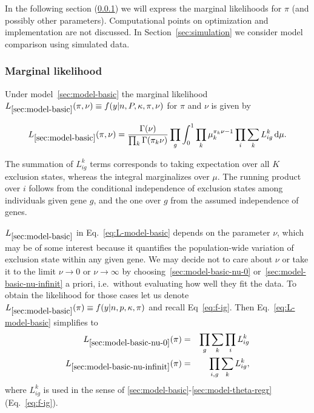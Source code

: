 \documentclass[letterpaper]{article}
\begin{document}
In the following section (\ref{sec:marginal-likelihood-pi}) we will express
the marginal likelihoods for \(\pi\) (and possibly other parameters).
Computational points on optimization and implementation are not discussed.  In
Section~\ref{sec:simulation} we consider model comparison using simulated
data.

\subsubsection{Marginal likelihood}
\label{sec:marginal-likelihood-pi}

Under model~\ref{sec:model-basic} the marginal likelihood
\(L_{\ref{sec:model-basic}}(\pi,\nu)\equiv
f(y|n,P,\kappa,\pi,\nu)\) for \(\pi\) and \(\nu\) is given by

\begin{equation}
\label{eq:L-model-basic}
L_{\ref{sec:model-basic}}(\pi,\nu) =
\frac{\Gamma(\nu)}{\prod_k \Gamma(\pi_k\nu)}
\prod_{g} \int_{0}^{1} \prod_k \mu_k^{\pi_k\nu-1}
\prod_{i}
\sum_k L_{ig}^k
\, \mathrm{d}\mu.
\end{equation}

The summation of \(L_{ig}^k\) terms corresponds to taking expectation over all
\(K\) exclusion states, whereas the integral marginalizes over \(\mu\).  The
running product over \(i\) follows from the conditional independence of
exclusion states among individuals given gene \(g\), and the one over \(g\)
from the assumed independence of genes.

\(L_{\ref{sec:model-basic}}\) in Eq.~\ref{eq:L-model-basic} depends on the parameter \(\nu\), which
may be of some interest because it quantifies the population-wide variation of
exclusion state within any given gene.  We may decide not to care about \(\nu\) or take
it to the limit \(\nu\rightarrow 0\) or \(\nu\rightarrow \infty\) by
choosing~\ref{sec:model-basic-nu-0} or~\ref{sec:model-basic-nu-infinit} a
priori, i.e.~without evaluating how well they fit the data.  To obtain the
likelihood for those cases let us denote \(L_{\ref{sec:model-basic}}(\pi)\equiv
f(y|n,p,\kappa,\pi)\) and recall Eq~\ref{eq:f-ig}.  Then
Eq.~\ref{eq:L-model-basic} simplifies to
\begin{eqnarray}
\label{eq:L-model-basic-nu-0}
L_{\ref{sec:model-basic-nu-0}}(\pi) &=&
\prod_{g}
\sum_k \prod_i L_{ig}^k
\\
\label{eq:L-model-basic-nu-infinit}
L_{\ref{sec:model-basic-nu-infinit}}(\pi) &=&
\prod_{i,g}
\sum_k L_{ig}^k,
\end{eqnarray}
where \(L_{ig}^k\) is used in the sense of
\ref{sec:model-basic}-\ref{sec:model-theta-regr} (Eq.~\ref{eq:f-ig}).
\end{document}
